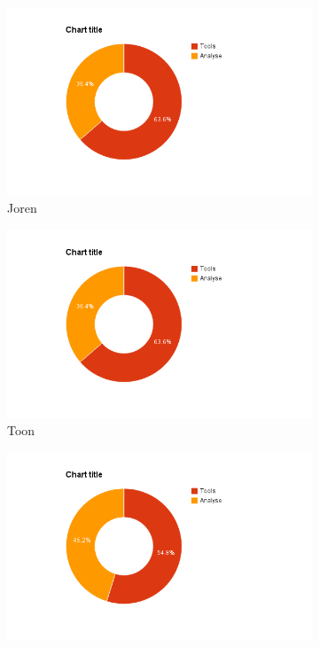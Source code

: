 \documentclass[i1]{oss}
\begin{document}
\begin{figure}[h!]
        \centering
        \begin{subfigure}[hb]{0.15\textwidth}
                \centering
                \includegraphics[width=\textwidth]{chart_2}
                \caption{Joren}
        \end{subfigure}%
        \begin{subfigure}[hb]{0.15\textwidth}
                \centering
                \includegraphics[width=\textwidth]{chart_3}
                \caption{Toon}
        \end{subfigure}%
        \begin{subfigure}[hb]{0.15\textwidth}
                \centering
                \includegraphics[width=\textwidth]{chart_4}

\end{subfigure}
\end{figure}
\end{document}
